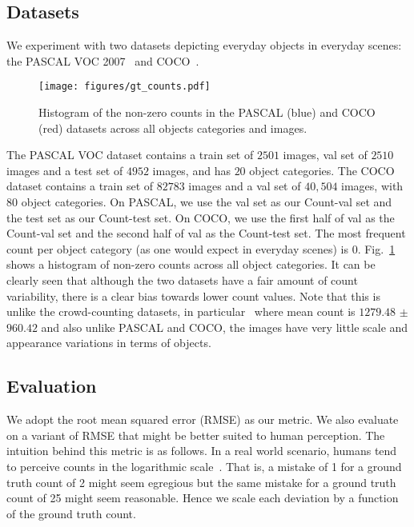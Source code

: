 \documentclass[10pt,twocolumn,letterpaper]{article}
\newcommand{\pascal}{PASCAL\xspace}
\begin{document}
\subsection{Datasets} 
We experiment with two datasets depicting everyday objects in everyday scenes: the \pascal VOC 2007~\cite{Everingham15} and COCO~\cite{LinECCV14coco}. 
\begin{figure}[t]
\texttt{[image: figures/gt\_counts.pdf]}
\vspace{-15pt}
\caption{\footnotesize{Histogram of the non-zero counts in the PASCAL (blue) and COCO (red) datasets across all objects categories and images.}}
\label{fig:histograms}
\vspace{-15pt}
\end{figure}
The PASCAL VOC dataset contains a train set of $2501$ images, val set of $2510$ images and a test set of $4952$ images, and has $20$ object categories. The COCO dataset contains a train set of $82783$ images and a val set of $40,504$ images, with $80$ object categories. On PASCAL, we use the val set as our Count-val set and the test set as our Count-test set. On COCO, we use the first half of val as the Count-val set and the second half of val as the Count-test set. The most frequent count per object category (as one would expect in everyday scenes) is $0$. Fig.~\ref{fig:histograms} shows a histogram of non-zero counts across all object categories. It can be clearly seen that although the two datasets have a fair amount of count variability, there is a clear bias towards lower count values. Note that this is unlike the crowd-counting datasets, in particular~\cite{Idrees} where mean count is $1279.48$ $\pm$ $960.42$ and also unlike PASCAL and COCO, the images have very little scale and appearance variations in terms of objects. 


\subsection{Evaluation}\label{subsec:metrics}
We adopt the root mean squared error (RMSE) as our metric.
We also evaluate on a variant of RMSE that might be better suited to human perception. The intuition behind this metric is as follows. In a real world scenario, humans tend to perceive counts in the logarithmic scale~\cite{dehaene2008log}.
That is, a mistake of 1 for a ground truth count of 2 might seem egregious but the same mistake for a ground truth count of 25 might seem reasonable. Hence we scale each deviation by a function of the ground truth count.
\end{document}
